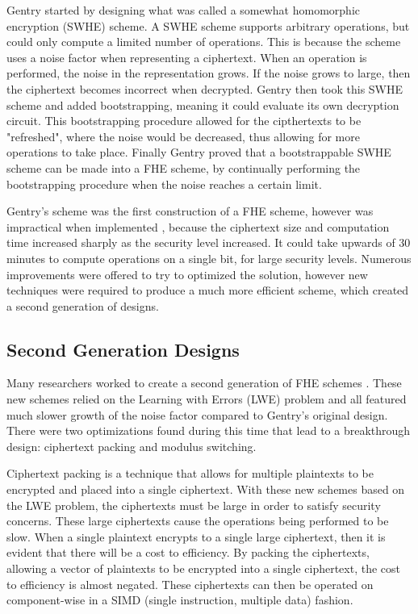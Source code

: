 Gentry started by designing what was called a somewhat homomorphic encryption (SWHE) scheme. A SWHE scheme supports arbitrary operations, but could only compute a limited number of operations. This is because the scheme uses a noise factor when representing a ciphertext. When an operation is performed, the noise in the representation grows. If the noise grows to large, then the ciphertext becomes incorrect when decrypted. Gentry then took this SWHE scheme and added bootstrapping, meaning it could evaluate its own decryption circuit. This bootstrapping procedure allowed for the cipthertexts to be "refreshed", where the noise would be decreased, thus allowing for more operations to take place. Finally Gentry proved that a bootstrappable SWHE scheme can be made into a FHE scheme, by continually performing the bootstrapping procedure when the noise reaches a certain limit.

Gentry's scheme was the first construction of a FHE scheme, however was impractical when implemented \cite{cryptoeprint:2010:520}, because the ciphertext size and computation time increased sharply as the security level increased. It could take upwards of 30 minutes to compute operations on a single bit, for large security levels. Numerous improvements \cite{cryptoeprint:2010:299} \cite{smart2010fully} \cite{cryptoeprint:2011:133} \cite{cryptoeprint:2011:279} were offered to try to optimized the solution, however new techniques were required to produce a much more efficient scheme, which created a second generation of designs.

\subsection{Second Generation Designs}
Many researchers worked to create a second generation of FHE schemes \cite{cryptoeprint:2011:344} \cite{cryptoeprint:2012:078} \cite{cryptoeprint:2013:094} \cite{cryptoeprint:2013:340}. These new schemes relied on the Learning with Errors (LWE) problem and all featured much slower growth of the noise factor compared to Gentry's original design. There were two optimizations found during this time that lead to a breakthrough design: ciphertext packing and modulus switching. 

Ciphertext packing \cite{brakerski2013packed} is a technique that allows for multiple plaintexts to be encrypted and placed into a single ciphertext. With these new schemes based on the LWE problem, the ciphertexts must be large in order to satisfy security concerns. These large ciphertexts cause the operations being performed to be slow. When a single plaintext encrypts to a single large ciphertext, then it is evident that there will be a cost to efficiency. By packing the ciphertexts, allowing a vector of plaintexts to be encrypted into a single ciphertext, the cost to efficiency is almost negated. These ciphertexts can then be operated on component-wise in a SIMD (single instruction, multiple data) fashion. 

